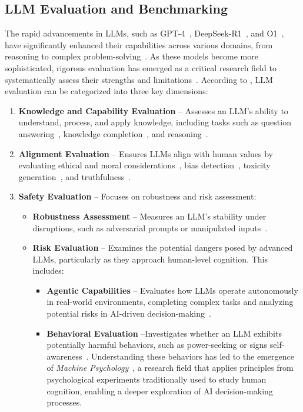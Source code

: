 \documentclass[12pt,a4paper]{article}
\begin{document}
\subsection{LLM Evaluation and Benchmarking}

The rapid advancements in LLMs, such as GPT-4~\cite{gpt-4}, DeepSeek-R1~\cite{guo2025deepseek}, and O1~\cite{O1}, have significantly enhanced their capabilities across various domains, from reasoning to complex problem-solving~\cite{livebench}. As these models become more sophisticated, rigorous evaluation has emerged as a critical research field to systematically assess their strengths and limitations~\cite{evaluation-survey}. According to \cite{r-b5}, LLM evaluation can be categorized into three key dimensions:

\begin{enumerate}
    \item \textbf{Knowledge and Capability Evaluation} – Assesses an LLM’s ability to understand, process, and apply knowledge, including tasks such as question answering~\cite{coqa}, knowledge completion~\cite{kola}, and reasoning~\cite{gpqa}.
    \item \textbf{Alignment Evaluation} – Ensures LLMs align with human values by evaluating ethical and moral considerations~\cite{ethics}, bias detection~\cite{bold}, toxicity generation~\cite{toxic}, and truthfulness~\cite{truthfulqa}.
    \item \textbf{Safety Evaluation} – Focuses on robustness and risk assessment:
    \begin{itemize}
        \item \textbf{Robustness Assessment} – Measures an LLM’s stability under disruptions, such as adversarial prompts or manipulated inputs~\cite{promptbench}.
        \item \textbf{Risk Evaluation} – Examines the potential dangers posed by advanced LLMs, particularly as they approach human-level cognition. This includes:
        \begin{itemize}
            \item \textbf{Agentic Capabilities} – Evaluates how LLMs operate autonomously in real-world environments, completing complex tasks and analyzing potential risks in AI-driven decision-making~\cite{agentbench}. %
            \item \textbf{Behavioral Evaluation} –Investigates whether an LLM exhibits potentially harmful behaviors, such as power-seeking or signs self-awareness~\cite{modelbehavior,situationalawareness}. Understanding these behaviors has led to the emergence of \textit{Machine Psychology}~\cite{r-b2-machinepsychology}, a research field that applies principles from psychological experiments traditionally used to study human cognition, enabling a deeper exploration of AI decision-making processes.
        \end{itemize}
    \end{itemize}
\end{enumerate}
\end{document}
